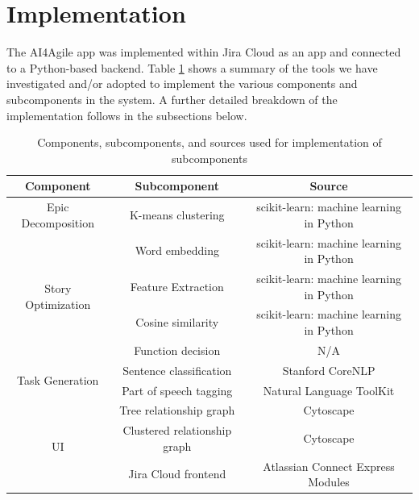 \section{Implementation}
\label{implementation}

The AI4Agile app was implemented within Jira Cloud as an app and connected to a Python-based backend. Table \ref{tab:tools} shows a summary of the tools we have investigated and/or adopted to implement the various components and subcomponents in the system. A further detailed breakdown of the implementation follows in the subsections below.

\begin{table}
\centering
\caption{Components, subcomponents, and sources used for implementation of subcomponents}
\label{tab:tools}
\begin{tabular}{ |c|c|c| } 
\hline
\multicolumn{1}{|c|}{\textbf{Component}} & \multicolumn{1}{c|}{\textbf{Subcomponent}} & \multicolumn{1}{c|}{\textbf{Source}} \\
\hline
Epic Decomposition & K-means clustering & scikit-learn: machine learning in Python \cite{scikit} \\
\hline
\multirow{4}{*}{Story Optimization} & Word embedding & scikit-learn: machine learning in Python \cite{scikit} \\ 
\cline{2-3}
& Feature Extraction & scikit-learn: machine learning in Python \cite{scikit} \\ 
\cline{2-3}
& Cosine similarity & scikit-learn: machine learning in Python \cite{scikit} \\
\cline{2-3}
& Function decision & N/A \\ 
\hline
\multirow{2}{*}{Task Generation} & Sentence classification & Stanford CoreNLP \cite{NLP1, stanza} \\ 
\cline{2-3}
& Part of speech tagging & Natural Language ToolKit \cite{nltk} \\ 
\hline
\multirow{3}{*}{UI} & Tree relationship graph & Cytoscape \cite{cytoscape} \\ 
\cline{2-3}
& Clustered relationship graph & Cytoscape \cite{cytoscape} \\ 
\cline{2-3}
& Jira Cloud frontend & Atlassian Connect Express Modules \cite{jiraconnect}\\ 
\hline
\end{tabular}
\end{table}

